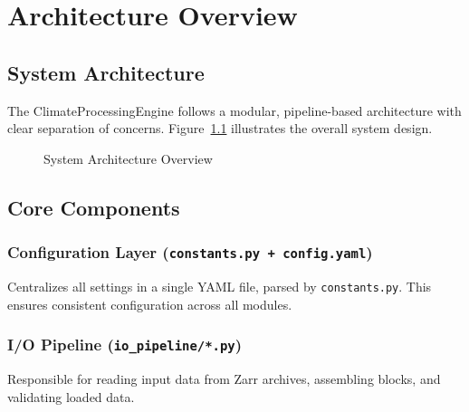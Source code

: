 ﻿\documentclass[12pt,a4paper]{report}
\begin{document}
\chapter{Architecture Overview}
\section{System Architecture}

The ClimateProcessingEngine follows a modular, pipeline-based architecture with clear separation of concerns. Figure~\ref{fig:architecture} illustrates the overall system design.

\begin{figure}[H]
    \centering
    \caption{System Architecture Overview}
    \label{fig:architecture}
\end{figure}

\section{Core Components}

\subsection{Configuration Layer (\texttt{constants.py + config.yaml})}
Centralizes all settings in a single YAML file, parsed by \texttt{constants.py}. This ensures consistent configuration across all modules.

\subsection{I/O Pipeline (\texttt{io\_pipeline/*.py})}
Responsible for reading input data from Zarr archives, assembling blocks, and validating loaded data.
\end{document}
